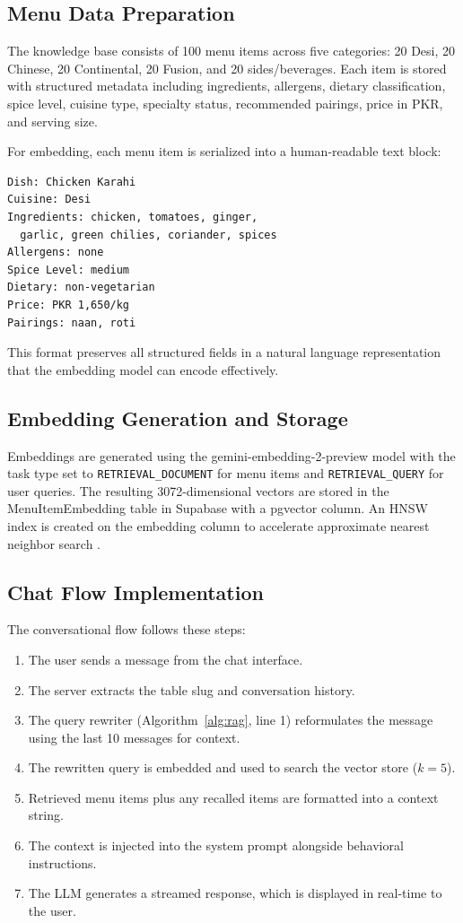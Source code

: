 \subsection{Menu Data Preparation}
The knowledge base consists of 100 menu items across five categories: 20 Desi, 20 Chinese, 20 Continental, 20 Fusion, and 20 sides/beverages. Each item is stored with structured metadata including ingredients, allergens, dietary classification, spice level, cuisine type, specialty status, recommended pairings, price in PKR, and serving size.

For embedding, each menu item is serialized into a human-readable text block:
\begin{verbatim}
Dish: Chicken Karahi
Cuisine: Desi
Ingredients: chicken, tomatoes, ginger,
  garlic, green chilies, coriander, spices
Allergens: none
Spice Level: medium
Dietary: non-vegetarian
Price: PKR 1,650/kg
Pairings: naan, roti
\end{verbatim}

This format preserves all structured fields in a natural language representation that the embedding model can encode effectively.

\subsection{Embedding Generation and Storage}
Embeddings are generated using the gemini-embedding-2-preview model \cite{Choi2026GeminiEmbedding2} with the task type set to \texttt{RETRIEVAL\_DOCUMENT} for menu items and \texttt{RETRIEVAL\_QUERY} for user queries. The resulting 3072-dimensional vectors are stored in the MenuItemEmbedding table in Supabase with a pgvector column. An HNSW index is created on the embedding column to accelerate approximate nearest neighbor search \cite{Malkov2020HNSW}.

\subsection{Chat Flow Implementation}
The conversational flow follows these steps:
\begin{enumerate}
    \item The user sends a message from the chat interface.
    \item The server extracts the table slug and conversation history.
    \item The query rewriter (Algorithm~\ref{alg:rag}, line 1) reformulates the message using the last 10 messages for context.
    \item The rewritten query is embedded and used to search the vector store ($k=5$).
    \item Retrieved menu items plus any recalled items are formatted into a context string.
    \item The context is injected into the system prompt alongside behavioral instructions.
    \item The LLM generates a streamed response, which is displayed in real-time to the user.
\end{enumerate}

